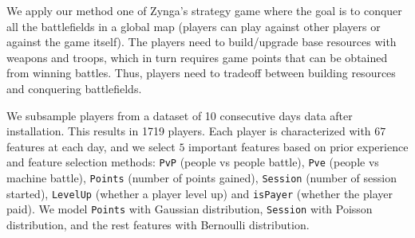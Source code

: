 We apply our method one of  Zynga's strategy game where the goal is to conquer all the battlefields
in a global map (players can play against other players or against the game itself). The players need to build/upgrade base resources with  weapons and troops, which in turn 
requires game points that can be obtained from winning battles.  Thus,  players need to 
tradeoff between building resources and conquering battlefields.


We subsample players from  a dataset of 10 consecutive days data after installation. This results in 1719 players.
Each player is characterized with $67$ features at each day, and we select $5$ important 
features based on prior experience and feature selection methods: \texttt{PvP} (people vs people battle), 
\texttt{Pve} (people vs machine battle), \texttt{Points} (number of points gained), \texttt{Session} 
(number of session started), \texttt{LevelUp} (whether a player level up) and \texttt{isPayer} (whether
the player paid). We model \texttt{Points}  with Gaussian distribution, \texttt{Session} with
Poisson distribution, and the rest features with Bernoulli distribution.






